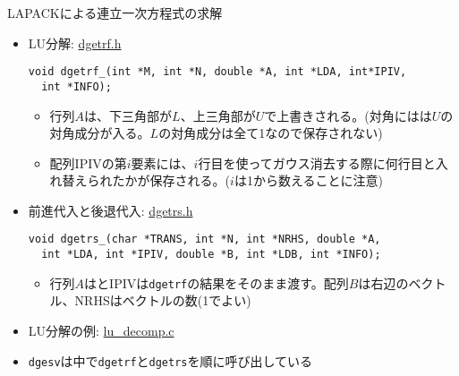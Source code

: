 \begin{frame}[t,fragile]{LAPACKによる連立一次方程式の求解}
  \begin{itemize}
  \item LU分解: \href{https://github.com/todo-group/computer-experiments/blob/master/exercise/linear_system/dgetrf.h}{dgetrf.h}
\begin{lstlisting}
void dgetrf_(int *M, int *N, double *A, int *LDA, int*IPIV,
  int *INFO);
\end{lstlisting}
\begin{itemize}
\item 行列$A$は、下三角部が$L$、上三角部が$U$で上書きされる。(対角にはは$U$の対角成分が入る。$L$の対角成分は全て1なので保存されない)
\item 配列IPIVの第$i$要素には、$i$行目を使ってガウス消去する際に何行目と入れ替えられたかが保存される。($i$は1から数えることに注意)
\end{itemize}
  \item 前進代入と後退代入: \href{https://github.com/todo-group/computer-experiments/blob/master/exercise/linear_system/dgetrs.h}{dgetrs.h}
\begin{lstlisting}
void dgetrs_(char *TRANS, int *N, int *NRHS, double *A,
  int *LDA, int *IPIV, double *B, int *LDB, int *INFO);
\end{lstlisting}
\begin{itemize}
\item 行列$A$はとIPIVは{\tt dgetrf}の結果をそのまま渡す。配列$B$は右辺のベクトル、NRHSはベクトルの数(1でよい)
\end{itemize}
  \item LU分解の例: \href{https://github.com/todo-group/computer-experiments/blob/master/exercise/linear_system/lu_decomp.c}{lu\_decomp.c}
  \item {\tt dgesv}は中で{\tt dgetrf}と{\tt dgetrs}を順に呼び出している
  \end{itemize}
\end{frame}
